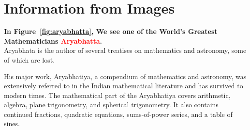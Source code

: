 \documentclass{article}
\begin{document}
\section{Information from Images}

\textbf{In Figure~\ref{fig:aryabhatta}, We see one of the World's Greatest Mathematicians \textcolor{red}{Aryabhatta}.}\\

Aryabhata is the author of several treatises on mathematics and astronomy, some of which are lost.

His major work, Aryabhatiya, a compendium of mathematics and astronomy, was extensively referred to in the Indian mathematical literature and has survived to modern times. The mathematical part of the Aryabhatiya covers arithmetic, algebra, plane trigonometry, and spherical trigonometry. It also contains continued fractions, quadratic equations, sums-of-power series, and a table of sines.
\end{document}
